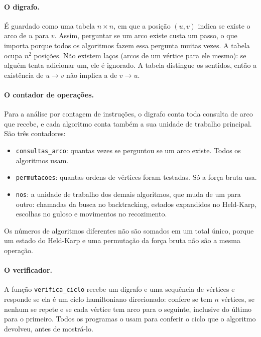 \documentclass[12pt,a4paper]{article}
\begin{document}
\paragraph{O digrafo.} É guardado como uma tabela $n\times n$, em que a posição $(u,v)$ indica se existe o arco de $u$ para $v$. Assim, perguntar se um arco existe custa um passo, o que importa porque todos os algoritmos fazem essa pergunta muitas vezes. A tabela ocupa $n^2$ posições. Não existem laços (arcos de um vértice para ele mesmo): se alguém tenta adicionar um, ele é ignorado. A tabela distingue os sentidos, então a existência de $u\to v$ não implica a de $v\to u$.

\paragraph{O contador de operações.} Para a análise por contagem de instruções, o digrafo conta toda consulta de arco que recebe, e cada algoritmo conta também a sua unidade de trabalho principal. São três contadores:
\begin{itemize}
  \item \texttt{consultas\_arco}: quantas vezes se perguntou se um arco existe. Todos os algoritmos usam.
  \item \texttt{permutacoes}: quantas ordens de vértices foram testadas. Só a força bruta usa.
  \item \texttt{nos}: a unidade de trabalho dos demais algoritmos, que muda de um para outro: chamadas da busca no backtracking, estados expandidos no Held-Karp, escolhas no guloso e movimentos no recozimento.
\end{itemize}
Os números de algoritmos diferentes não são somados em um total único, porque um estado do Held-Karp e uma permutação da força bruta não são a mesma operação.

\paragraph{O verificador.} A função \texttt{verifica\_ciclo} recebe um digrafo e uma sequência de vértices e responde se ela é um ciclo hamiltoniano direcionado: confere se tem $n$ vértices, se nenhum se repete e se cada vértice tem arco para o seguinte, inclusive do último para o primeiro. Todos os programas o usam para conferir o ciclo que o algoritmo devolveu, antes de mostrá-lo.
\end{document}
